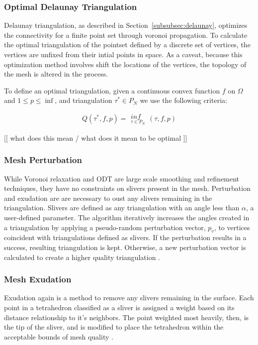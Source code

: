 \documentclass[12pt]{drexelthesis}
\let\Oldsubsubsection\subsubsection
\renewcommand{\subsubsection}{\FloatBarrier\Oldsubsubsection}
\begin{document}
\subsubsection{Optimal Delaunay Triangulation}
Delaunay triangulation, as described in Section~\ref{subsubsec:delaunay}, optimizes the connectivity for a finite point set through voronoi propagation. To calculate the optimal triangulation of the pointset defined by a discrete set of vertices, the vertices are unfixed from their intial points in space. As a caveat, because this optimization method involves shift the locations of the vertices, the topology of the mesh is altered in the process.

To define an optimal triangulation, given a continuous convex function $f$ on $\Omega$ and $1 \leq p \leq \inf$, and triangulation $\tau^{\ast} \in P_{N}$ we use the following criteria:

\begin{equation}
	Q ( \tau^{\ast}  , f, p) = \substack{inf \\ _{\tau \in P_{N}} } (\tau , f, p)
\end{equation}

[[ what does this mean / what does it mean to be optimal ]]

\subsubsection{Mesh Perturbation}
While  Voronoi  relaxation  and  ODT  are  large  scale  smoothing  and  refinement  techniques,  they  have  no  constraints  on  slivers  present  in  the  mesh.  Perturbation  and  exudation  are  are  necessary  to  oust  any  slivers  remaining  in  the  triangulation.  Slivers  are  defined  as  any  triangulation  with  an  angle  less  than  $\alpha$,  a  user-defined  parameter.  The  algorithm  iteratively  increases  the  angles  created  in  a  triangulation  by  applying  a  pseudo-random  perturbation  vector,  $p_{v}$,  to  vertices  coincident  with  triangulations  defined  as  slivers.  If  the  perturbation  results  in  a  success,  resulting  triangulation  is  kept.  Otherwise,  a  new  perturbation  vector  is  calculated  to  create  a  higher  quality  triangulation  \cite{RN63}. 

\subsubsection{Mesh Exudation}
Exudation  again  is  a  method  to  remove  any  slivers  remaining  in  the  surface.  Each  point  in  a  tetrahedron  classified  as  a  sliver  is  assigned  a  weight  based  on  its distance  relationship  to  it’s  neighbors.  The  point  weighted  most  heavily,  then,  is  the  tip  of  the  sliver,  and  is  modified  to  place  the  tetrahedron  within  the  acceptable  bounds  of  mesh  quality  \cite{RN64}. 
\end{document}
